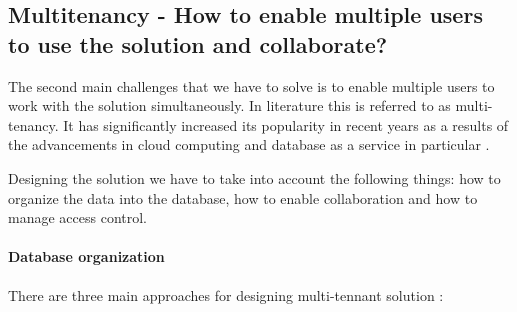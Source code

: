 \documentclass[a4paper, notitlepage]{article}
\begin{document}
\subsection{Multitenancy - How to enable multiple users to use the solution and collaborate?}
The second main challenges that we have to solve is to enable multiple users to work with the solution simultaneously. In literature this is referred to as multi-tenancy. It has significantly increased its popularity in recent years as a results of the advancements in cloud computing and database as a service in particular \cite{Hui}. 

Designing the solution we have to take into account the following things: how to organize the data into the database, how to enable collaboration and how to manage access control.

\paragraph{Database organization}
There are three main approaches for designing multi-tennant solution \cite{Hui}:
\end{document}
